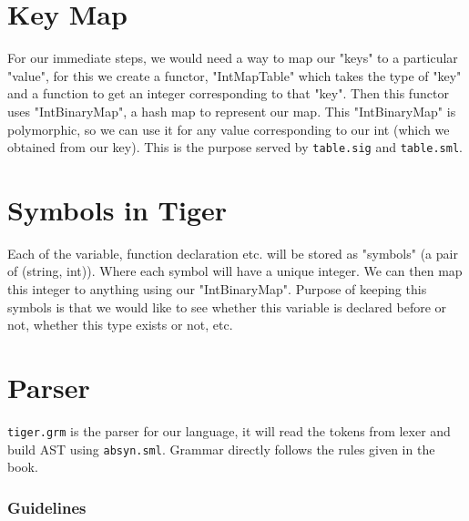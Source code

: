 \section{Key Map}

For our immediate steps, we would need a way to map our "keys" to a particular "value", for this we create a functor, "IntMapTable" which takes the type of "key" and a function to get an integer corresponding to that "key". Then this functor uses "IntBinaryMap", a hash map to represent our map. This "IntBinaryMap" is polymorphic, so we can use it for any value corresponding to our int (which we obtained from our key). This is the purpose served by \texttt{table.sig} and \texttt{table.sml}. 

\section{Symbols in Tiger}


Each of the variable, function declaration etc. will be stored as "symbols" (a pair of (string, int)). Where each symbol will have a unique integer. We can then map this integer to anything using our "IntBinaryMap". Purpose of keeping this symbols is that we would like to see whether this variable is declared before or not, whether this type exists or not, etc.

\section{Parser}


\texttt{tiger.grm} is the parser for our language, it will read the tokens from lexer and build AST using \texttt{absyn.sml}. Grammar directly follows the rules given in the book.

\subsubsection{Guidelines}

